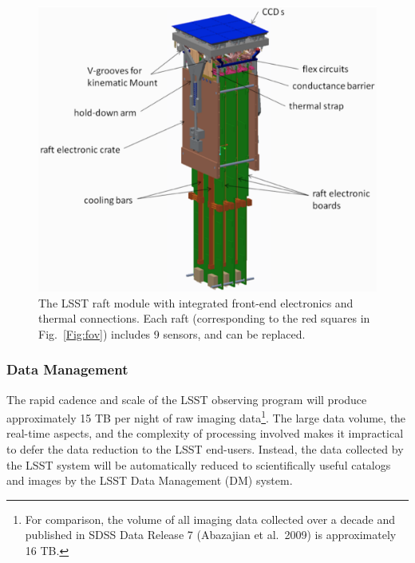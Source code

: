 \begin{figure}[ht]
\includegraphics[width=1.\hsize,clip]{raft-updated-cropped.pdf}
\caption{The LSST raft module with integrated front-end electronics
and thermal connections. Each raft (corresponding to the red squares
in Fig.~\ref{Fig:fov})
includes 9 sensors, and can be replaced.}
\label{Fig:raft}
\end{figure}



\vskip 0.2in
\subsubsection{ Data Management }
\label{sec:dm}

The rapid cadence and scale of the LSST observing program will produce
approximately 15 TB per night of raw imaging data\footnote{For
  comparison, the volume of all imaging data collected over a decade
  and published in SDSS Data Release 7 (Abazajian et al.~2009) is approximately 16 TB.}. The large data volume, the real-time aspects, and the complexity of processing involved makes it impractical to defer the data reduction to the LSST end-users. Instead, the data collected by the LSST system will be automatically reduced to scientifically useful catalogs and images by the LSST Data Management (DM) system.
\\

